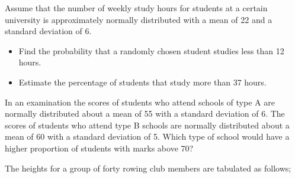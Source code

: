 \documentclass[]{article}
\begin{document}
	Assume that the number of weekly study hours for students at a certain university
	is approximately normally distributed with a mean of 22 and a standard deviation
	of 6.
	\begin{itemize}
		\item Find the probability that a randomly chosen student studies less than 12
		hours.
		\item Estimate the percentage of students that study more than 37 hours.
	\end{itemize}
	

%
%
%	
%
%	
	In an examination the scores of students who attend schools of type A are
	normally distributed about a mean of 55 with a standard deviation of 6. The
	scores of students who attend type B schools are normally distributed about a
	mean of 60 with a standard deviation of 5.
	Which type of school would have a higher proportion of students with marks above 70?

The heights for a group of forty rowing club members are tabulated as follows;
\end{document}
